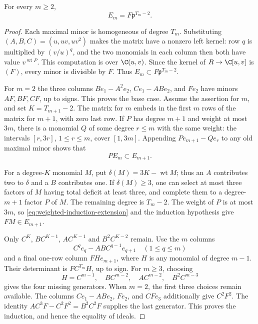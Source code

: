 \begin{lemma}
\label{lem:weighted-relation-minors}
For every $m\ge2$,
\begin{equation}\label{eq:weighted-minor-identity}
 E_m=F\mathfrak p^{T_m-2}.
\end{equation}
\end{lemma}
\begin{proof}
Each maximal minor is homogeneous of degree $T_m$. Substituting
$(A,B,C)=(u,uv,uv^2)$ makes the matrix have a nonzero left kernel:
row $q$ is multiplied by $(v/u)^q$, and the two monomials in each
column then both have value $v^{\operatorname{wt}P}$. This computation
is over $\C(u,v)$. Since the kernel of
$R\to\C[u,v]$ is $(F)$, every minor is divisible by $F$. Thus
$E_m\subset F\mathfrak p^{T_m-2}$.

For $m=2$ the three columns
$Be_1-A^2e_2$, $Ce_1-ABe_2$, and $Fe_2$ have minors
$AF,BF,CF$, up to signs. This proves the base case.
Assume the assertion for $m$, and set $K=T_{m+1}-2$.
The matrix for $m$ embeds in the first $m$ rows of the matrix for
$m+1$, with zero last row. If $P$ has degree $m+1$ and weight at
most $3m$, there is a monomial $Q$ of some degree $r\le m$ with
the same weight: the intervals $[r,3r]$, $1\le r\le m$, cover
$[1,3m]$. Appending $Pe_{m+1}-Qe_r$ to any old maximal minor shows
that
\begin{equation}\label{eq:weighted-induction-extension}
 P E_m\subset E_{m+1}.
\end{equation}

For a degree-$K$ monomial $M$, put
$\delta(M)=3K-\operatorname{wt}M$; thus an $A$ contributes two to
$\delta$ and a $B$ contributes one. If $\delta(M)\ge3$, one can
select at most three factors of $M$ having total deficit at least
three, and complete them to a degree-$m+1$ factor $P$ of $M$.
The remaining degree is $T_m-2$. The weight of $P$ is at most
$3m$, so \eqref{eq:weighted-induction-extension} and the induction
hypothesis give $FM\in E_{m+1}$.

Only $C^K$, $BC^{K-1}$, $AC^{K-1}$ and $B^2C^{K-2}$ remain.
Use the $m$ columns
\[
 C^qe_q-ABC^{q-1}e_{q+1}\quad(1\le q\le m)
\]
and a final one-row column $FH e_{m+1}$, where $H$ is any monomial
of degree $m-1$. Their determinant is $FC^{T_m}H$, up to sign.
For $m\ge3$, choosing
\[
 H=C^{m-1},\quad BC^{m-2},\quad AC^{m-2},\quad B^2C^{m-3}
\]
gives the four missing generators. When $m=2$, the first three
choices remain available. The columns
$Ce_1-ABe_2$, $Fe_2$, and $CFe_3$ additionally give $C^2F^2$.
The identity
$AC^3F-C^2F^2=B^2C^2F$ supplies the last generator.
This proves the induction, and hence the equality of ideals.
\end{proof}


